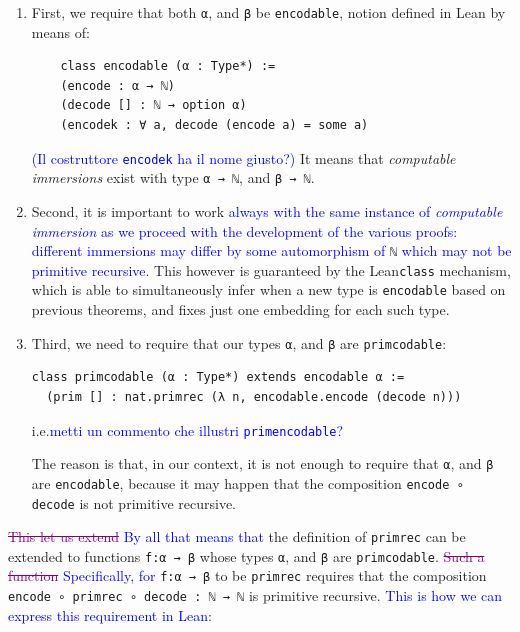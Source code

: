 \documentclass[preprint]{elsarticle}
\theoremstyle{remark}
\newcommand{\LEAN}{\textsf{Lean}\xspace}
\begin{document}
\begin{enumerate}
\item
First, we require that both \lstinline|α|, and \lstinline|β| be \lstinline|encodable|, notion defined in \LEAN by means of:

\begin{lstlisting}
    class encodable (α : Type*) :=
    (encode : α → ℕ)
    (decode [] : ℕ → option α)
    (encodek : ∀ a, decode (encode a) = some a)
\end{lstlisting}
\textcolor{blue}{(Il costruttore \texttt{encodek} ha il nome giusto?)}
\noindent
It means that \emph{computable immersions} exist with type \lstinline|α → ℕ|, and \lstinline|β → ℕ|.

\item
Second, it is important to work \textcolor{blue}{always with the same instance of \emph{computable immersion} as we proceed with the development of the various proofs: different immersions may differ by some automorphism of} \lstinline|ℕ| \textcolor{blue}{which may not be primitive recursive}. This however is guaranteed by the \LEAN \lstinline|class| mechanism, which is able to simultaneously infer when a new type is \lstinline|encodable| based on previous theorems, and fixes just one embedding for each such type.

\item
Third, we need to require that our types \lstinline|α|, and \lstinline|β| are \lstinline|primcodable|:

\begin{lstlisting}
class primcodable (α : Type*) extends encodable α :=
  (prim [] : nat.primrec (λ n, encodable.encode (decode n)))
\end{lstlisting}
\noindent
i.e.\@ \textcolor{blue}{metti un commento che illustri \lstinline|primencodable|?}

The reason is that, in our context, it is not enough to require that \lstinline|α|, and \lstinline|β| are \lstinline|encodable|, because it may happen that the composition \lstinline|encode ∘ decode| is not primitive recursive.
\end{enumerate}

\textcolor{purple}{\sout{This let us extend}} \textcolor{blue}{By all that means that} the definition of \lstinline|primrec| can be extended to functions \lstinline|f:α → β| whose types \lstinline|α|, and \lstinline|β| are \lstinline|primcodable|. \textcolor{purple}{\sout{Such a function}} \textcolor{blue}{Specifically, for} \lstinline|f:α → β| to be \lstinline|primrec| requires that the composition \lstinline|encode ∘ primrec ∘ decode : ℕ → ℕ| is primitive recursive. \textcolor{blue}{This is how we can express this requirement in \LEAN:}
\end{document}
